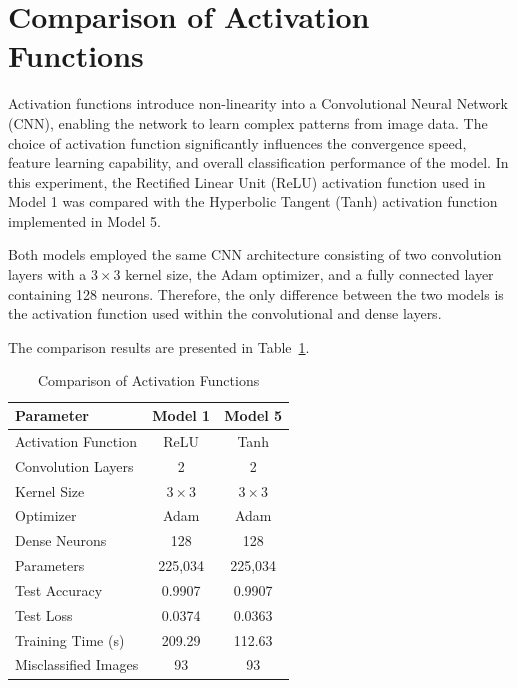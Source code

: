 
\section{Comparison of Activation Functions}

Activation functions introduce non-linearity into a Convolutional Neural Network (CNN), enabling the network to learn complex patterns from image data. The choice of activation function significantly influences the convergence speed, feature learning capability, and overall classification performance of the model. In this experiment, the Rectified Linear Unit (ReLU) activation function used in Model 1 was compared with the Hyperbolic Tangent (Tanh) activation function implemented in Model 5.

Both models employed the same CNN architecture consisting of two convolution layers with a $3\times3$ kernel size, the Adam optimizer, and a fully connected layer containing 128 neurons. Therefore, the only difference between the two models is the activation function used within the convolutional and dense layers.

The comparison results are presented in Table~\ref{tab:activationcomparison}.

\begin{table}[H]
\centering
\caption{Comparison of Activation Functions}\label{tab:activationcomparison}

\begin{tabular}{lcc}
\toprule
\textbf{Parameter} & \textbf{Model 1} & \textbf{Model 5} \\
\midrule
Activation Function & ReLU & Tanh\\
Convolution Layers & 2 & 2\\
Kernel Size & $3\times3$ & $3\times3$\\
Optimizer & Adam & Adam\\
Dense Neurons & 128 & 128\\
Parameters & 225,034 & 225,034\\
Test Accuracy & 0.9907 & 0.9907\\
Test Loss & 0.0374 & 0.0363\\
Training Time (s) & 209.29 & 112.63\\
Misclassified Images & 93 & 93\\
\bottomrule
\end{tabular}

\end{table}


